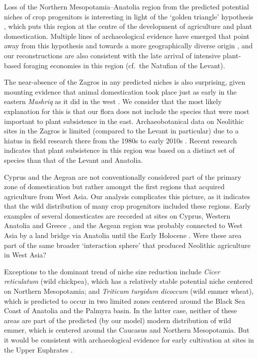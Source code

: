 \documentclass[
  authoryear,
  preprint]{elsarticle}
\begin{document}
Loss of the Northern Mesopotamia--Anatolia region from the predicted
potential niches of crop progenitors is interesting in light of the
`golden triangle' hypothesis
\citep{Lev-YadunEtAl2000, KozlowskiAurenche2005, AbboEtAl2010}, which
puts this region at the centre of the development of agriculture and
plant domestication. Multiple lines of archaeological evidence have
emerged that point away from this hypothesis and towards a more
geographically diverse origin
\citep{Asouti2006, FullerEtAl2011, ArranzOtaeguiEtAl2016}, and our
reconstructions are also consistent with the late arrival of intensive
plant-based foraging economies in this region (cf.~the Natufian of the
Levant).

The near-absence of the Zagros in any predicted niches is also
surprising, given mounting evidence that animal domestication took place
just as early in the eastern \emph{Mashriq} as it did in the west
\citep{Zeder2024}. We consider that the most likely explanation for this
is that our flora does not include the species that were most important
to plant subsistence in the east. Archaeobotanical data on Neolithic
sites in the Zagros is limited (compared to the Levant in particular)
due to a hiatus in field research there from the 1980s to early 2010s
\citep{Zeder2024}. Recent research
\citep{RiehlEtAl2013, WeideEtAl2017, WeideEtAl2018, WhitlamEtAl2018, GonzalezCarreteroEtAl2023}
indicates that plant subsistence in this region was based on a distinct
set of species than that of the Levant and Anatolia.

Cyprus and the Aegean are not conventionally considered part of the
primary zone of domestication but rather amongst the first regions that
acquired agriculture from West Asia. Our analysis complicates this
picture, as it indicates that the wild distribution of many crop
progenitors included these regions. Early examples of several
domesticates are recorded at sites on Cyprus, Western Anatolia and
Greece \citep{ArranzOtaeguiRoe2023}, and the Aegean region was probably
connected to West Asia by a land bridge via Anatolia until the Early
Holocene \citep{AksuHiscott2022}. Were these area part of the same
broader `interaction sphere' that produced Neolithic agriculture in West
Asia?

Exceptions to the dominant trend of niche size reduction include
\emph{Cicer reticulatum} (wild chickpea), which has a relatively stable
potential niche centered on Northern Mesopotamia; and \emph{Triticum
turgidum dicoccum} (wild emmer wheat), which is predicted to occur in
two limited zones centered around the Black Sea Coast of Anatolia and
the Palmyra basin. In the latter case, neither of these areas are part
of the predicted (by our model) modern distribution of wild emmer, which
is centered around the Caucasus and Northern Mesopotamia. But it would
be consistent with archaeological evidence for early cultivation at
sites in the Upper Euphrates \citep{Willcox2024}.
\end{document}
